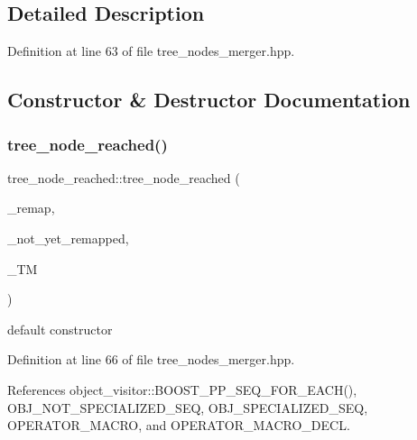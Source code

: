\subsection{Detailed Description}


Definition at line 63 of file tree\+\_\+nodes\+\_\+merger.\+hpp.



\subsection{Constructor \& Destructor Documentation}
\mbox{\label{structtree__node__reached_a70e5d64f5a1e008ac4c12e7193e54a66}} 
\subsubsection{\texorpdfstring{tree\+\_\+node\+\_\+reached()}{tree\_node\_reached()}}
{\footnotesize\ttfamily tree\+\_\+node\+\_\+reached\+::tree\+\_\+node\+\_\+reached (\begin{DoxyParamCaption}\item[{\hyperlink{custom__map_8hpp_a8cbaceffc09790a885ec7e9c17809c69}{Custom\+Unordered\+Map\+Unstable}$<$ unsigned int, unsigned int $>$ \&}]{\+\_\+remap,  }\item[{\hyperlink{custom__set_8hpp_a0e09160c8f8e7883e68096bbb174762e}{Ordered\+Set\+Std}$<$ unsigned int $>$ \&}]{\+\_\+not\+\_\+yet\+\_\+remapped,  }\item[{const \hyperlink{tree__manager_8hpp_a96ff150c071ce11a9a7a1e40590f205e}{tree\+\_\+manager\+Ref}}]{\+\_\+\+TM }\end{DoxyParamCaption})\hspace{0.3cm}{\ttfamily [inline]}}



default constructor 



Definition at line 66 of file tree\+\_\+nodes\+\_\+merger.\+hpp.



References object\+\_\+visitor\+::\+B\+O\+O\+S\+T\+\_\+\+P\+P\+\_\+\+S\+E\+Q\+\_\+\+F\+O\+R\+\_\+\+E\+A\+C\+H(), O\+B\+J\+\_\+\+N\+O\+T\+\_\+\+S\+P\+E\+C\+I\+A\+L\+I\+Z\+E\+D\+\_\+\+S\+EQ, O\+B\+J\+\_\+\+S\+P\+E\+C\+I\+A\+L\+I\+Z\+E\+D\+\_\+\+S\+EQ, O\+P\+E\+R\+A\+T\+O\+R\+\_\+\+M\+A\+C\+RO, and O\+P\+E\+R\+A\+T\+O\+R\+\_\+\+M\+A\+C\+R\+O\+\_\+\+D\+E\+CL.

